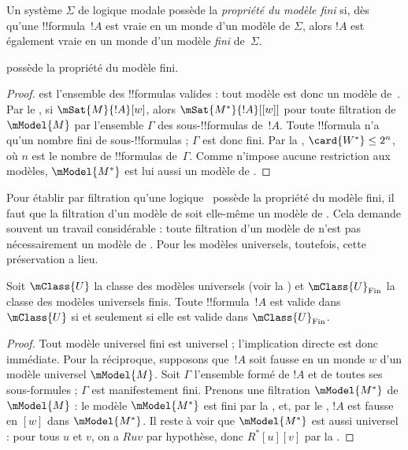 \documentclass[../../../include/open-logic-section]{subfiles}
\begin{document}


\begin{defn}
  Un système $\Sigma$ de logique modale possède la \emph{propriété du
    modèle fini} si, dès qu'une !!{formula}~$!A$ est vraie en un monde
  d'un modèle de $\Sigma$, alors $!A$ est également vraie en un monde d'un
  modèle \emph{fini} de~$\Sigma$.
\end{defn}

\begin{prop}
   possède la propriété du modèle fini.
\end{prop}

\begin{proof}
   est l'ensemble des !!{formula}s valides : tout modèle est
  donc un modèle de~. Par le , si
  $\mSat{M}{!A}[w]$, alors $\mSat{M^*}{!A}[{[w]}]$ pour toute
  filtration de~$\mModel{M}$ par l'ensemble $\Gamma$ des
  sous-!!{formula}s de~$!A$. Toute !!{formula} n'a qu'un nombre fini
  de sous-!!{formula}s ; $\Gamma$ est donc fini. Par la
  , $\card{W^*} \le 2^n$, où $n$
  est le nombre de !!{formula}s de~$\Gamma$. Comme  n'impose
  aucune restriction aux modèles, $\mModel{M^*}$ est lui aussi un
  modèle de .
\end{proof}

Pour établir par filtration qu'une logique~ possède la
propriété du modèle fini, il faut que la filtration d'un modèle de
 soit elle-même un modèle de . Cela demande souvent un
travail considérable : toute filtration d'un modèle de  n'est
pas nécessairement un modèle de . Pour les modèles universels,
toutefois, cette préservation a lieu.

\begin{prop}
  Soit $\mClass{U}$ la classe des modèles universels (voir la
  ) et $\mClass{U}_\mathrm{Fin}$ la
  classe des modèles universels finis. Toute !!{formula}~$!A$ est
  valide dans $\mClass{U}$ si et seulement si elle est valide dans
  $\mClass{U}_\mathrm{Fin}$.
\end{prop}

\begin{proof}
  Tout modèle universel fini est universel ; l'implication directe est
  donc immédiate. Pour la réciproque, supposons que~$!A$ soit fausse
  en un monde $w$ d'un modèle universel $\mModel{M}$. Soit
  $\Gamma$ l'ensemble formé de $!A$ et de toutes ses sous-formules ;
  $\Gamma$ est manifestement fini. Prenons une filtration $\mModel{M^*}$ de
  $\mModel{M}$ : le modèle $\mModel{M^*}$ est fini par la
  , et, par le
  , $!A$ est fausse en $[w]$ dans
  $\mModel{M^*}$. Il reste à voir que $\mModel{M^*}$ est aussi
  universel : pour tous $u$ et $v$, on a $Ruv$ par hypothèse, donc
  $R^*[u][v]$ par la
  .
\end{proof}
\end{document}
